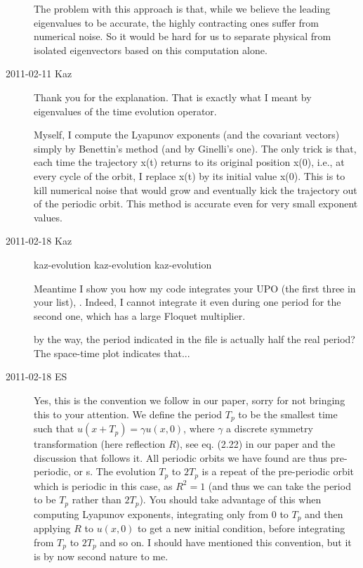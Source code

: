 \begin{description}
The problem with this approach is that, while we believe the leading
eigenvalues to be accurate, the highly contracting ones suffer from
numerical noise. So it would be hard for us to separate physical from
isolated eigenvectors based on this computation alone.

\item[2011-02-11 Kaz] Thank you for the explanation. That is exactly what
I meant by eigenvalues of the time evolution operator.

Myself, I compute the Lyapunov exponents (and the covariant vectors) simply
by Benettin's method (and by Ginelli's one). The only trick is that, each time
the trajectory x(t) returns to its original position x(0), i.e., at every cycle
of the orbit, I replace x(t) by its initial value x(0). This is to kill
numerical noise that would grow and eventually kick the trajectory
out of the periodic orbit. This method is accurate even for very small
exponent values.

\item[2011-02-18 Kaz]

{kaz-evolution}   %
{}   %
{    %
kaz-evolution
}
{kaz-evolution}   %


Meantime I show you how my code integrates your UPO (the first three in your
list), . Indeed, I cannot integrate
it even during one period for the second one, which has a large
Floquet multiplier.

by the way, the period indicated in the file is actually half the real period?
The space-time plot indicates that...

\item[2011-02-18 ES]

Yes, this is the convention we follow in our paper, sorry for not
bringing this to your attention. We define the period $T_p$ to be the
smallest time such that $u(x+T_p)=\gamma u(x,0)$, where $\gamma$ a
discrete symmetry transformation (here reflection $R$), see eq. (2.22) in
our paper and the discussion that follows it. All periodic orbits we
have found are thus pre-periodic, or \rpo s.
The evolution
$T_p$ to $2T_p$ is a repeat of the pre-periodic orbit which
is periodic in this case, as $R^2=1$ (and thus we can take the period to be $T_p$
rather than $2T_p$). You should take advantage of this
when computing Lyapunov exponents, integrating only from $0$ to $T_p$ and
then applying $R$ to $u(x,0)$ to get a new initial condition, before
integrating from $T_p$ to $2T_p$ and so on. I should have mentioned this
convention, but it is by now second nature to me.


\end{description}

